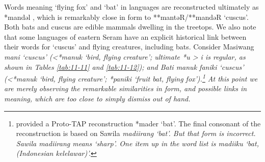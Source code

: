 Words meaning ‘flying fox’
and ‘bat’ in  languages are reconstructed ultimately as *mandəl
\citep[493]{UsherSchapper2022},
 which is remarkably close in form to **mantəR/**mandəR ‘cuscus’.
Both bats and cuscus are edible mammals dwelling in the treetops.
We also note that some languages of eastern Seram have an explicit
historical link between their words for ‘cuscus’
and flying creatures, including bats.
Consider Masiwang \it{mani} ‘cuscus’ (<*manuk ‘bird,
flying creature’; ultimate *u > \it{i} is regular,
as shown in Tables \ref{tab:11-11}
and \ref{tab:11-12}); and Bati \it{manuk faniki} ‘cuscus’ (<*manuk ‘bird,
flying creature’; *paniki ‘fruit bat, flying fox’).\footnote{
		\citet[269]{Schapper2011} provided a Proto-TAP reconstruction *mader ‘bat’.
		The final consonant of the reconstruction is based on Sawila \it{madiirang} ‘bat’.
		But that form is incorrect.
		Sawila \it{madiirang} means ‘sharp’.
		One item up in the word list is \it{madiiku} ‘bat,
		(Indonesian \it{kelelawar})’.}
At this point we are merely observing the remarkable similarities
in form, and possible links in meaning,
which are too close to simply dismiss out of hand.

